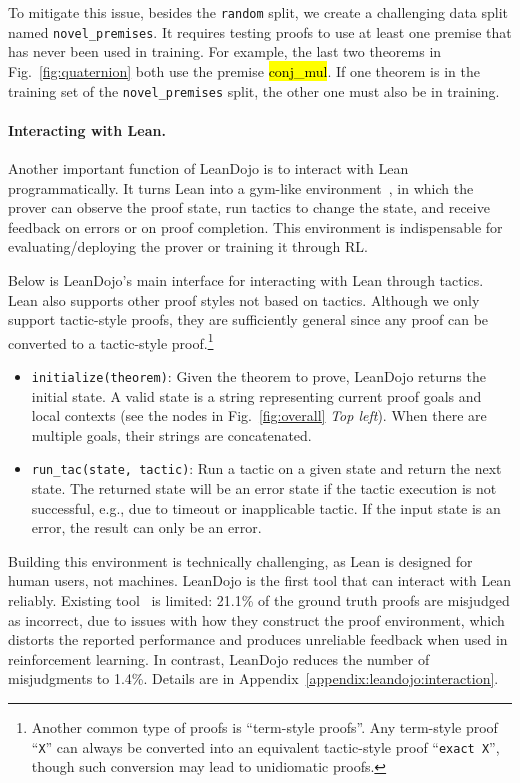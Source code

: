 \documentclass{article}
\DeclareRobustCommand{\hlgray}[1]{{\sethlcolor{mygray}\hl{#1}}}
\newcommand{\smallsec}[1]{\vspace{-1mm} \paragraph{#1.}}
\begin{document}
To mitigate this issue, besides the \texttt{random} split, we create a challenging data split named \texttt{novel\_premises}. It requires testing proofs to use at least one premise that has never been used in training. For example, the last two theorems in Fig.~\ref{fig:quaternion} both use the premise \hlgray{conj\_mul}. If one theorem is in the training set of the \texttt{novel\_premises} split, the other one must also be in training.


\smallsec{Interacting with Lean}
Another important function of LeanDojo is to interact with Lean programmatically. It turns Lean into a gym-like environment~\cite{brockman2016openai}, in which the prover can observe the proof state, run tactics to change the state, and receive feedback on errors or on proof completion. This environment is indispensable for evaluating/deploying the prover or training it through RL. 

Below is LeanDojo's main interface for interacting with Lean through tactics. Lean also supports other proof styles not based on tactics. Although we only support tactic-style proofs, they are sufficiently general since any proof can be converted to a tactic-style proof.\footnote{Another common type of proofs is ``term-style proofs''. Any term-style proof ``\texttt{X}'' can always be converted into an equivalent tactic-style proof ``\texttt{exact X}'', though such conversion may lead to unidiomatic proofs.}
\begin{itemize}[leftmargin=*]

\item \texttt{initialize(theorem)}: Given the theorem to prove, LeanDojo returns the initial state. A valid state is a string representing current proof goals and local contexts (see the nodes in Fig.~\ref{fig:overall} \emph{Top left}). When there are multiple goals, their strings are concatenated.

\item \texttt{run\_tac(state, tactic)}: Run a tactic on a given state and return the next state. The returned state will be an error state if the tactic execution is not successful, e.g., due to timeout or inapplicable tactic. If the input state is an error, the result can only be an error.

\end{itemize}

Building this environment is technically challenging, as Lean is designed for human users, not machines. LeanDojo is the first tool that can interact with Lean reliably. Existing tool~\cite{polu2023formal} is limited: 21.1\% of the ground truth proofs are misjudged as incorrect, due to issues with how they construct the proof environment, which distorts the reported performance and produces unreliable feedback when used in reinforcement learning. In contrast, LeanDojo reduces the number of misjudgments to 1.4\%. Details are in Appendix~\ref{appendix:leandojo:interaction}.
\end{document}
